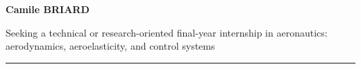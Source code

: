 \begin{center}
  {\Huge\bfseries\color{accent}Camile BRIARD}\par
  \vspace{4pt}
  {\large\color{textsoft} Seeking a technical or research-oriented final-year internship in aeronautics: aerodynamics, aeroelasticity, and control systems}\par
\end{center}
\vspace{4pt}
{\color{accent}\rule{\linewidth}{0.8pt}}
\vspace{6pt}
